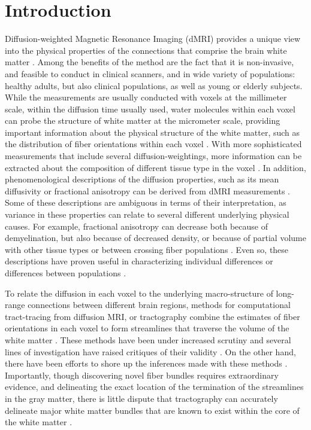 \section*{Introduction}

Diffusion-weighted Magnetic Resonance Imaging (dMRI) provides a unique view into
the physical properties of the connections that comprise the brain white matter
\cite{wandell2016clarifying}. Among the benefits of the method are the fact that
it is non-invasive, and feasible to conduct in clinical scanners, and in wide
variety of populations: healthy adults, but also clinical populations, as well
as young or elderly subjects. While the measurements are usually conducted with
voxels at the millimeter scale, within the diffusion time usually used, water
molecules within each voxel can probe the structure of white matter at the
micrometer scale, providing important information about the physical structure
of the white matter, such as the distribution of fiber orientations within each
voxel \cite{Frank2002-iz, Frank2001-xf}. With more sophisticated measurements
that include several diffusion-weightings, more information can be extracted
about the composition of different tissue type in the voxel
\cite{Jeurissen2014-ab, Kaden2016-ho}. In addition, phenomenological
descriptions of the diffusion properties, such as its mean diffusivity or
fractional anisotropy can be derived from dMRI measurements
\cite{Pierpaoli1996-vj}. Some of these descriptions are ambiguous in terms of
their interpretation, as variance in these properties can relate to several
different underlying physical causes. For example, fractional anisotropy can
decrease both because of demyelination, but also because of decreased density,
or because of partial volume with other tissue types or between crossing fiber
populations \cite{Beaulieu1996-fn, Beaulieu2002-tl}. Even so, these descriptions
have proven useful in characterizing individual differences or differences
between populations \cite{}.

To relate the diffusion in each voxel to the underlying macro-structure of
long-range connections between different brain regions, methods for
computational tract-tracing from diffusion MRI, or tractography combine the
estimates of fiber orientations in each voxel to form streamlines that traverse
the volume of the white matter \cite{Conturo1999-je, Mori2002-qi}. These methods
have been under increased scrutiny and several lines of investigation have
raised critiques of their validity \cite{Maier-Hein2017-vb, Thomas2014-ki}. On
the other hand, there have been efforts to shore up the inferences made with
these methods \cite{Pestilli2014NatMeth, Takemura2016-sh, Smith2013-nc,
Smith2015-cx, Smith2015-zt, Rheault2018-wk}. Importantly, though discovering
novel fiber bundles requires extraordinary evidence, and delineating the exact
location of the termination of the streamlines in the gray matter, there is
little dispute that tractography can accurately delineate major white matter
bundles that are known to exist within the core of the white matter
.

